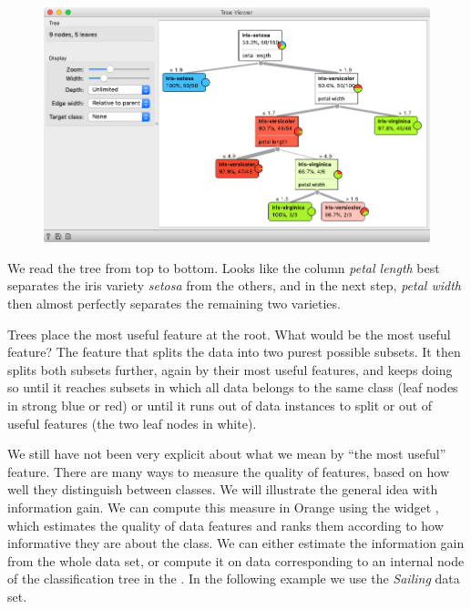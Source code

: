 \begin{figure}
    \includegraphics[scale=0.35]{tree-viewer.png}
    \label{fig:classification-predictions}
\end{figure}

We read the tree from top to bottom. Looks like the column \textit{petal length} best separates the iris variety \textit{setosa} from the others, and in the next step, \textit{petal width} then almost perfectly separates the remaining two varieties.

Trees place the most useful feature at the root. What would be the most useful feature? The feature that splits the data into two purest possible subsets. It then splits both subsets further, again by their most useful features, and keeps doing so until it reaches subsets in which all data belongs to the same class (leaf nodes in strong blue or red) or until it runs out of data instances to split or out of useful features (the two leaf nodes in white).

We still have not been very explicit about what we mean by ``the most useful'' feature. There are many ways to measure the quality of features, based on how well they distinguish between classes. We will illustrate the general idea with information gain. We can compute this measure in Orange using the  widget , which estimates the quality of data features and ranks them according to how informative they are about the class. We can either estimate the information gain from the whole data set, or compute it on data corresponding to an internal node of the classification tree in the . In the following example we use the \textit{Sailing} data set.

